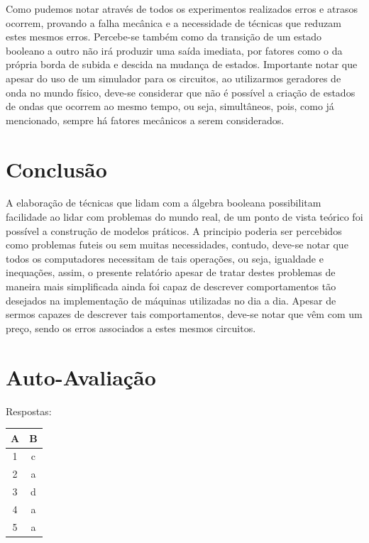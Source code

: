 \documentclass[12pt]{article}
\begin{document}
Como pudemos notar através de todos os experimentos realizados erros e atrasos
ocorrem, provando a falha mecânica e a necessidade de técnicas que reduzam estes
mesmos erros. Percebe-se também como da transição de um estado booleano a outro
não irá produzir uma saída imediata, por fatores como o da própria borda de
subida e descida na mudança de estados. Importante notar que apesar do uso de um
simulador para os circuitos, ao utilizarmos geradores de onda no mundo físico,
deve-se considerar que não é possível a criação de estados de ondas que ocorrem
ao mesmo tempo, ou seja, simultâneos, pois, como já mencionado, sempre há
fatores mecânicos a serem considerados.

\section{Conclusão}
\label{sec:Conclusao}

A elaboração de técnicas que lidam com a álgebra booleana possibilitam
facilidade ao lidar com problemas do mundo real, de um ponto de vista teórico
foi possível a construção de modelos práticos. A principio poderia ser
percebidos como problemas futeis ou sem muitas necessidades, contudo, deve-se
notar que todos os computadores necessitam de tais operações, ou seja, igualdade
e inequações, assim, o presente relatório apesar de tratar destes problemas de
maneira mais simplificada ainda foi capaz de descrever comportamentos tão
desejados na implementação de máquinas utilizadas no dia a dia. Apesar de sermos
capazes de descrever tais comportamentos, deve-se notar que vêm com um preço,
sendo os erros associados a estes mesmos circuitos.

\nocite{*}



\newpage
\section*{Auto-Avaliação}

Respostas:
\begin{table}[H]
     \begin{tabular}{|c|c|} \hline
     \textbf{A} & \textbf{B}\\
     \hline
     1 & c \\ \hline
     2 & a \\ \hline
     3 & d \\ \hline
     4 & a \\ \hline
     5 & a \\ \hline
     \end{tabular}
\end{table}
\end{document}
